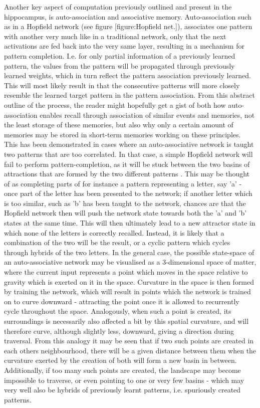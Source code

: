 Another key aspect of computation previously outlined and present in the hippocampus, is auto-association and associative memory. Auto-association such as in a Hopfield network (see figure [figure:Hopfield net.]), associates one pattern with another very much like in a traditional network, only that the next activations are fed back into the very same layer, resulting in a mechanism for pattern completion. I.e. for only partial information of a previously learned pattern, the values from the pattern will be propagated through previously learned weights, which in turn reflect the pattern association previously learned. This will most likely result in that the consecutive patterns will more closely resemble the learned target pattern in the pattern association. From this abstract outline of the process, the reader might hopefully get a gist of both how auto-association enables recall through association of similar events and memories, not the least storage of these memories, but also why only a certain amount of memories may be stored in short-term memories working on these principles. This has been demonstrated in cases where an auto-associative network is taught two patterns that are too correlated. In that case, a simple Hopfield network will fail to perform pattern-completion, as it will be stuck between the two basins of attractions that are formed by the two different patterns \citep{Rolls1998chpt3}. This may be thought of as completing parts of for instance a pattern representing a letter, say 'a' - once part of the letter has been presented to the network; if another letter which is too similar, such as 'b' has been taught to the network, chances are that the Hopfield network then will push the network state towards both the 'a' and 'b' states at the same time. This will then ultimately lead to a new attractor state in which none of the letters is correctly recalled. Instead, it is likely that a combination of the two will be the result, or a cyclic pattern which cycles through hybrids of the two letters.
In the general case, the possible state-space of an auto-associative network may be visualised as a 3-dimensional space of matter, where the current input represents a point which moves in the space relative to gravity which is exerted on it in the space. Curvature in the space is then formed by training the network, which will result in points which the network is trained on to curve downward - attracting the point once it is allowed to recurrently cycle throughout the space. Analogously, when such a point is created, its surroundings is necessarily also affected a bit by this spatial curvature, and will therefore curve, although slightly less, downward, giving a direction during traversal. From this analogy it may be seen that if two such points are created in each others neighbourhood, there will be a given distance between them when the curvature exerted by the creation of both will form a new basin in between. Additionally, if too many such points are created, the landscape may become impossible to traverse, or even pointing to one or very few basins - which may very well also be hybrids of previously learnt patterns, i.e. spuriously created patterns.
